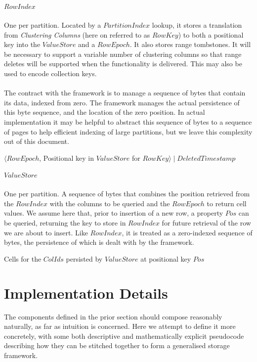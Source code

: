 \documentclass[fleqn]{article}
\begin{document}
\clearpage
\subparagraph{$RowIndex$}
\subparagraph{}
    One per partition. Located by a $PartitionIndex$ lookup, it stores a translation from \textit{Clustering Columns}
    (here on referred to as $RowKey$) to both a positional key into the $ValueStore$ and a $RowEpoch$. It also
    stores range tombstones. It will be necessary to support a variable number of clustering columns so that
    range deletes will be supported when the functionality is delivered. This may also be used to encode 
    collection keys. 
    \\\\
    The contract with the framework is to manage 
    a sequence of bytes that contain its data, indexed from zero. The framework manages the actual persistence 
    of this byte sequence, and the location of the zero position. In actual implementation it may be helpful 
    to abstract this sequence of bytes to a sequence of pages to help efficient indexing of large partitions, 
    but we leave this complexity out of this document.
    \\
    \begin{algorithmic}[2]
    \scriptsize
    \Statex \Return $\langle RowEpoch$, Positional key in $ValueStore$ for $RowKey\rangle \mid DeletedTimestamp$
    \EndFunction
    \end{algorithmic}

\subparagraph{$ValueStore$}
\subparagraph{}
    One per partition. A sequence of bytes that combines the position retrieved from the $RowIndex$ with the 
    columns to be queried and the $RowEpoch$ to return cell values. We assume here that, prior to insertion of 
    a new row, a property $Pos$ can be queried, returning the key to store in $RowIndex$ 
    for future retrieval of the row we are about to insert.
    Like $RowIndex$, it is treated as a zero-indexed sequence of bytes, the persistence of which is dealt 
    with by the framework.
    \\
    \begin{algorithmic}[2]
    \scriptsize
    \Statex \Return Cells for the $ColIds$ persisted by $ValueStore$ at positional key $Pos$
    \EndFunction
    \end{algorithmic}

\paragraph{}
\section{Implementation Details}
\small
The components defined in the prior section should compose reasonably naturally, as far as intuition
is concerned. Here we attempt to define it more concretely, with some both descriptive and mathematically
explicit pseudocode describing how they can be stitched together to form a generalised storage framework.
\\
\end{document}
